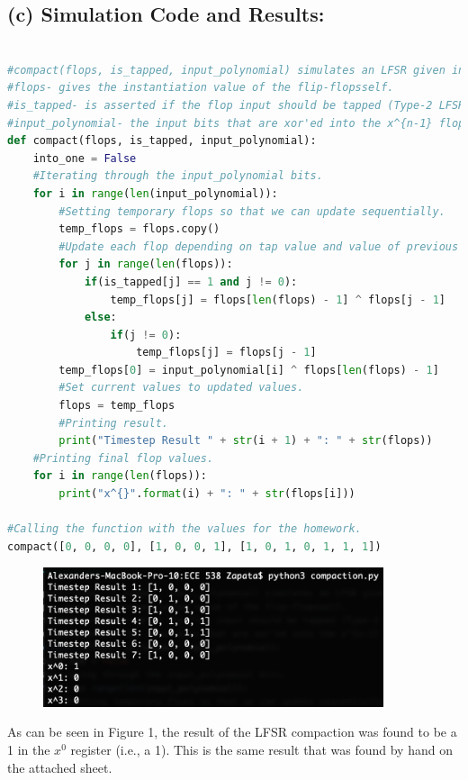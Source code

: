 \documentclass[letterpaper]{article} %
\begin{document}
\subsection*{(c) Simulation Code and Results:}
\begin{lstlisting}[language=Python, caption=Python code used to simulate LFSR compaction]
	
#compact(flops, is_tapped, input_polynomial) simulates an LFSR given input params.
#flops- gives the instantiation value of the flip-flopsself.
#is_tapped- is asserted if the flop input should be tapped (Type-2 LFSR) high-order -> low-order.
#input_polynomial- the input bits that are xor'ed into the x^{n-1} flop in order.
def compact(flops, is_tapped, input_polynomial):
    into_one = False
    #Iterating through the input_polynomial bits.
    for i in range(len(input_polynomial)):
        #Setting temporary flops so that we can update sequentially.
        temp_flops = flops.copy()
        #Update each flop depending on tap value and value of previous flop.
        for j in range(len(flops)):
            if(is_tapped[j] == 1 and j != 0):
                temp_flops[j] = flops[len(flops) - 1] ^ flops[j - 1]
            else:
                if(j != 0):
                    temp_flops[j] = flops[j - 1]
        temp_flops[0] = input_polynomial[i] ^ flops[len(flops) - 1]
        #Set current values to updated values.
        flops = temp_flops
        #Printing result.
        print("Timestep Result " + str(i + 1) + ": " + str(flops))
    #Printing final flop values.
    for i in range(len(flops)):
        print("x^{}".format(i) + ": " + str(flops[i]))

#Calling the function with the values for the homework.
compact([0, 0, 0, 0], [1, 0, 0, 1], [1, 0, 1, 0, 1, 1, 1])
\end{lstlisting}

\begin{figure}[ht]
	\centering
	\includegraphics[width=10.0cm]{compaction_result.png}
\end{figure}
As can be seen in Figure 1, the result of the LFSR compaction was found to be a 1 in the $x^{0}$ register (i.e., a 1). This is the same result that was found by hand on the attached sheet.
\end{document}
